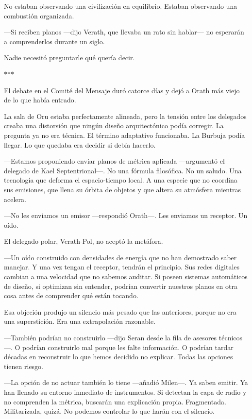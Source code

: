 \documentclass[11pt,a5paper,twoside]{book}
\begin{document}
No estaban observando una civilización en equilibrio. Estaban observando una combustión organizada.

—Si reciben planos —dijo Verath, que llevaba un rato sin hablar— no esperarán a comprenderlos durante un siglo.

Nadie necesitó preguntarle qué quería decir.

\vspace{1.5em}
\begin{center}$\ast$\quad$\ast$\quad$\ast$\end{center}
\vspace{1.5em}

El debate en el Comité del Mensaje duró catorce días y dejó a Orath más viejo de lo que había entrado.

La sala de Oru estaba perfectamente alineada, pero la tensión entre los delegados creaba una distorsión que ningún diseño arquitectónico podía corregir. La pregunta ya no era técnica. El término adaptativo funcionaba. La Burbuja podía llegar. Lo que quedaba era decidir si debía hacerlo.

—Estamos proponiendo enviar planos de métrica aplicada —argumentó el delegado de Kael Septentrional—. No una fórmula filosófica. No un saludo. Una tecnología que deforma el espacio-tiempo local. A una especie que no coordina sus emisiones, que llena su órbita de objetos y que altera su atmósfera mientras acelera.

—No les enviamos un emisor —respondió Orath—. Les enviamos un receptor. Un oído.

El delegado polar, Verath-Pol, no aceptó la metáfora.

—Un oído construido con densidades de energía que no han demostrado saber manejar. Y una vez tengan el receptor, tendrán el principio. Sus redes digitales cambian a una velocidad que no sabemos auditar. Si poseen sistemas automáticos de diseño, si optimizan sin entender, podrían convertir nuestros planos en otra cosa antes de comprender qué están tocando.

Esa objeción produjo un silencio más pesado que las anteriores, porque no era una superstición. Era una extrapolación razonable.

—También podrían no construirlo —dijo Seran desde la fila de asesores técnicos—. O podrían construirlo mal porque les falte información. O podrían tardar décadas en reconstruir lo que hemos decidido no explicar. Todas las opciones tienen riesgo.

—La opción de no actuar también lo tiene —añadió Milen—. Ya saben emitir. Ya han llenado su entorno inmediato de instrumentos. Si detectan la capa de radio y no comprenden la métrica, buscarán una explicación propia. Fragmentada. Militarizada, quizá. No podemos controlar lo que harán con el silencio.
\end{document}
